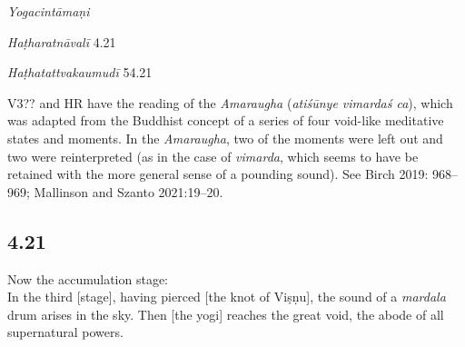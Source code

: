 \begin{ekdosis}
\begin{testimonia}[hp04_020]
\emph{Yogacintāmaṇi}
\begin{versinnote}
\end{versinnote}

\emph{Haṭharatnāvalī} 4.21
\begin{versinnote}
\end{versinnote}

\emph{Haṭhatattvakaumudī} 54.21
\begin{versinnote}
\end{versinnote}
\end{testimonia}

\begin{philcomm}[hp04_020]
V3?? and HR have the reading of the \textit{Amaraugha} (\textit{atiśūnye vimardaś ca}), which was adapted from the Buddhist concept of a series of four void-like meditative states and moments. In the \emph{Amaraugha},  two of the moments were left out and two were reinterpreted (as in the case of \emph{vimarda}, which seems to have be retained with the more general sense of a pounding sound). %
See Birch 2019: 968–969; Mallinson and Szanto 2021:19–20.
\end{philcomm}

\subsection*{4.21}
\begin{translation}[hp04_021]
Now the accumulation stage:\\
In the third [stage], having pierced [the knot of Viṣṇu], the sound of a \textit{mardala} drum arises in the sky. Then [the yogi] reaches the great void, the abode of all supernatural powers.%
\end{translation}
%


\end{ekdosis}
